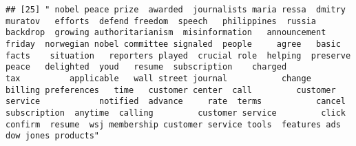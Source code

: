 \documentclass[
]{article}
\begin{document}
\begin{verbatim}
## [25] " nobel peace prize  awarded  journalists maria ressa  dmitry muratov   efforts  defend freedom  speech   philippines  russia   backdrop  growing authoritarianism  misinformation   announcement friday  norwegian nobel committee signaled  people     agree   basic facts    situation   reporters played  crucial role  helping  preserve peace   delighted  youd   resume  subscription    charged           tax          applicable   wall street journal           change  billing preferences   time   customer center  call         customer service            notified  advance     rate  terms           cancel  subscription  anytime  calling         customer service         click confirm  resume  wsj membership customer service tools  features ads  dow jones products"                                                                                                                                                                                                                                                                                                                                                                                                                                                                                                                                                                                                                                                                                                                                                                                                                                                                                                                                                                                                                                                                                                                                                                                                                                                                                                                                                                                                                                                                                                                                                                                                                                                                                                                                                                                                                                                                                                                                                                                                                                                                                                                                                                                                                                                                                                                                                                                                                                                                                                                                                                                                                                                   
\end{verbatim}
\end{document}
